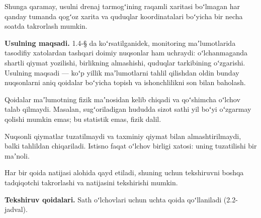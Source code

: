 Shunga qaramay, usulni drenaj tarmogʻining raqamli xaritasi boʻlmagan
har qanday tumanda qogʻoz xarita va quduqlar koordinatalari boʻyicha bir
necha soatda takrorlash mumkin.


\textbf{Usulning maqsadi.} 1.4-§ da koʻrsatilganidek, monitoring
maʼlumotlarida tasodifiy xatolardan tashqari doimiy nuqsonlar ham
uchraydi: oʻlchanmaganda shartli qiymat yozilishi, birlikning
almashishi, quduqlar tarkibining oʻzgarishi. Usulning maqsadi --- koʻp
yillik maʼlumotlarni tahlil qilishdan oldin bunday nuqsonlarni aniq
qoidalar boʻyicha topish va ishonchlilikni son bilan baholash.

Qoidalar maʼlumotning fizik maʼnosidan kelib chiqadi va qoʻshimcha
oʻlchov talab qilmaydi. Masalan, sugʻoriladigan hududda sizot sathi yil
boʻyi oʻzgarmay qolishi mumkin emas; bu statistik emas, fizik dalil.

Nuqsonli qiymatlar tuzatilmaydi va taxminiy qiymat bilan
almashtirilmaydi, balki tahlildan chiqariladi. Istisno faqat oʻlchov
birligi xatosi: uning tuzatilishi bir maʼnoli.

Har bir qoida natijasi alohida qayd etiladi, shuning uchun tekshiruvni
boshqa tadqiqotchi takrorlashi va natijasini tekshirishi mumkin.

\textbf{Tekshiruv qoidalari.} Sath oʻlchovlari uchun uchta qoida
qoʻllaniladi (2.2-jadval).



